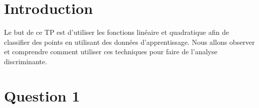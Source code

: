 \documentclass[a4paper,12pt]{report}
\begin{document}


\setcounter{page}{1} 
\newpage

\section*{Introduction}

Le but de ce TP est d'utiliser les fonctions linéaire et quadratique afin de classifier des points en utilisant des données d'apprentissage. Nous allons observer et comprendre comment utiliser ces techniques pour faire de l'analyse discriminante.
	
\section*{Question 1}
\end{document}
